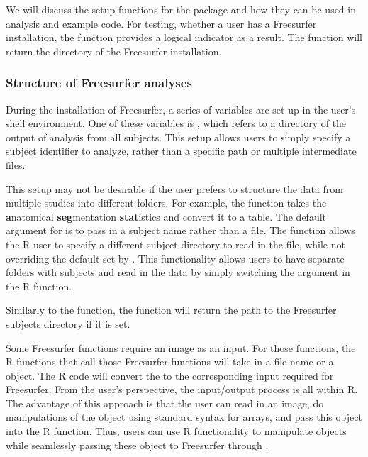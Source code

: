 We will discuss the setup functions for the  package and
how they can be used in analysis and example code. For testing, whether
a user has a Freesurfer installation, the  function
provides a logical indicator as a result. The  function
will return the directory of the Freesurfer installation.

\subsubsection{Structure of Freesurfer
analyses}\label{structure-of-freesurfer-analyses}

During the installation of Freesurfer, a series of variables are set up
in the user's shell environment. One of these variables is
, which refers to a directory of the output of
analysis from all subjects. This setup allows users to simply specify a
subject identifier to analyze, rather than a specific path or multiple
intermediate files.

This setup may not be desirable if the user prefers to structure the
data from multiple studies into different folders. For example, the
 function takes the \textbf{a}natomical
\textbf{seg}mentation \textbf{stat}istics and convert it to a table. The
default argument for  is to pass in a subject name
rather than a file. The   function
allows the R user to specify a different subject directory to read in
the file, while not overriding the default set by .
This functionality allows users to have separate folders with subjects
and read in the data by simply switching the  argument
in the R function.

Similarly to the  function, the 
function will return the path to the Freesurfer subjects directory if it
is set.

Some Freesurfer functions require an image as an input. For those
functions, the R  functions that call those Freesurfer
functions will take in a file name or a  object. The R code
will convert the  to the corresponding input required for
Freesurfer. From the user's perspective, the input/output process is all
within R. The advantage of this approach is that the user can read in an
image, do manipulations of the  object using standard syntax
for arrays, and pass this object into the  R function.
Thus, users can use R functionality to manipulate objects while
seamlessly passing these object to Freesurfer through .

